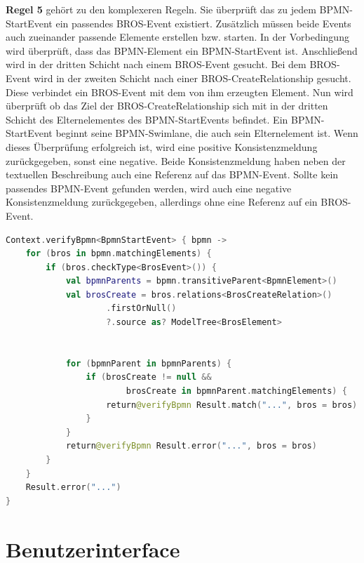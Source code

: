 \textbf{Regel 5} gehört zu den komplexeren Regeln.
Sie überprüft das zu jedem BPMN-StartEvent ein passendes BROS-Event existiert.
Zusätzlich müssen beide Events auch zueinander passende Elemente erstellen bzw. starten.
In der Vorbedingung wird überprüft, dass das BPMN-Element ein BPMN-StartEvent ist.
Anschließend wird in der dritten Schicht nach einem BROS-Event gesucht.
Bei dem BROS-Event wird in der zweiten Schicht nach einer BROS-CreateRelationship gesucht.
Diese verbindet ein BROS-Event mit dem von ihm erzeugten Element.
Nun wird überprüft ob das Ziel der BROS-CreateRelationship sich mit in der dritten Schicht des Elternelementes des BPMN-StartEvents befindet.
Ein BPMN-StartEvent beginnt seine BPMN-Swimlane, die auch sein Elternelement ist.
Wenn dieses Überprüfung erfolgreich ist, wird eine positive Konsistenzmeldung zurückgegeben, sonst eine negative.
Beide Konsistenzmeldung haben neben der textuellen Beschreibung auch eine Referenz auf das BPMN-Event.
Sollte kein passendes BPMN-Event gefunden werden, wird auch eine negative Konsistenzmeldung zurückgegeben, allerdings ohne eine Referenz auf ein BROS-Event.

\begin{lstlisting}[language=Kotlin, caption=Implementierung von Regel 5, label=lst:implementation_rule_5]
Context.verifyBpmn<BpmnStartEvent> { bpmn ->
    for (bros in bpmn.matchingElements) {
        if (bros.checkType<BrosEvent>()) {
            val bpmnParents = bpmn.transitiveParent<BpmnElement>()
            val brosCreate = bros.relations<BrosCreateRelation>()
                    .firstOrNull()
                    ?.source as? ModelTree<BrosElement>


            for (bpmnParent in bpmnParents) {
                if (brosCreate != null && 
                        brosCreate in bpmnParent.matchingElements) {
                    return@verifyBpmn Result.match("...", bros = bros)
                }
            }
            return@verifyBpmn Result.error("...", bros = bros)
        }
    }
    Result.error("...")
}
\end{lstlisting}

\pagebreak
\section{Benutzerinterface}


